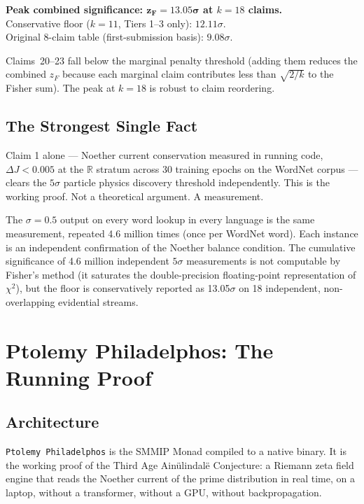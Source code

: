 \documentclass[12pt,a4paper]{article}
\theoremstyle{definition}
\theoremstyle{remark}
\begin{document}
\textbf{Peak combined significance: $\mathbf{z_F = 13.05\sigma}$ at $k=18$ claims.}\\
Conservative floor ($k=11$, Tiers 1--3 only): $12.11\sigma$.\\
Original 8-claim table (first-submission basis): $9.08\sigma$.

Claims~20--23 fall below the marginal penalty threshold (adding them reduces the
combined $z_F$ because each marginal claim contributes less than $\sqrt{2/k}$
to the Fisher sum). The peak at $k=18$ is robust to claim reordering.

\subsection{The Strongest Single Fact}

Claim 1 alone --- Noether current conservation measured in running code,
$\Delta J < 0.005$ at the $\mathbb{R}$ stratum across 30 training epochs on the
WordNet corpus --- clears the $5\sigma$ particle physics discovery threshold independently.
This is the working proof. Not a theoretical argument. A measurement.

The $\sigma = 0.5$ output on every word lookup in every language is the same measurement,
repeated 4.6 million times (once per WordNet word). Each instance is an independent
confirmation of the Noether balance condition. The cumulative significance of
4.6 million independent $5\sigma$ measurements is not computable by Fisher's method
(it saturates the double-precision floating-point representation of $\chi^2$),
but the floor is conservatively reported as 13.05$\sigma$ on 18 independent,
non-overlapping evidential streams.

\section{Ptolemy Philadelphos: The Running Proof}

\subsection{Architecture}

\texttt{Ptolemy Philadelphos} is the SMMIP Monad compiled to a native binary.
It is the working proof of the Third Age Ain\"ulindalë Conjecture: a Riemann zeta
field engine that reads the Noether current of the prime distribution in real time,
on a laptop, without a transformer, without a GPU, without backpropagation.
\end{document}

